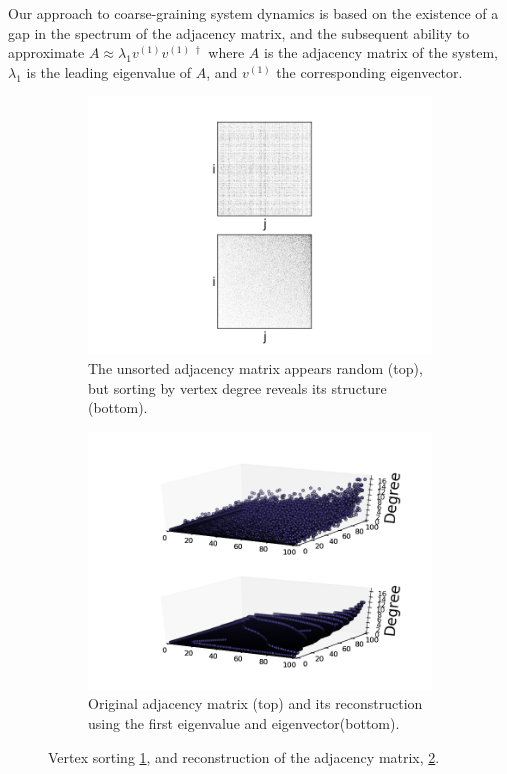 \documentclass[11pt]{article}
\begin{document}
\indent Our approach to coarse-graining system dynamics is based on the existence of a gap in the spectrum of the adjacency matrix, and the subsequent ability to approximate $A\approx \lambda_{1}v^{(1)}v^{(1) \;\dagger}$ where $A$ is the adjacency matrix of the system, $\lambda_{1}$ is the leading eigenvalue of $A$, and $v^{(1)}$ the corresponding eigenvector.
\begin{figure}[h!]
  \centering
  \begin{subfigure}{.5\textwidth}
    \centering
    \includegraphics[width=0.7\linewidth]{paAdjSort}
    \captionsetup{width=0.8\textwidth}
    \caption{The unsorted adjacency matrix appears random (top), but sorting by vertex degree reveals its structure (bottom).}
    \label{fig:paAdjSort}
  \end{subfigure}%
  \begin{subfigure}{.5\textwidth}
    \centering
    \includegraphics[width=0.7\linewidth]{paRecon}
    \captionsetup{width=0.8\textwidth}
    \caption{Original adjacency matrix (top) and its reconstruction using the first eigenvalue and eigenvector(bottom).}
    \label{fig:paRecon}
  \end{subfigure}%
  \caption{Vertex sorting \ref{fig:paAdjSort}, and reconstruction of the adjacency matrix, \ref{fig:paRecon}.}
  \label{fig:paAdj}
\end{figure}
\end{document}
